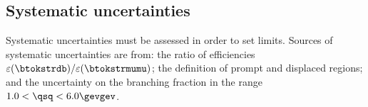 



\subsection{Systematic uncertainties}
Systematic uncertainties must be assessed in order to set limits.
Sources of systematic uncertainties are from:
the ratio of efficiencies $\varepsilon(\btokstrdb)/\varepsilon(\btokstrmumu)$;
the definition of prompt and displaced regions;
and the uncertainty on the \btokstrmumu branching fraction in the range $1.0<\qsq<6.0\gevgev$.

